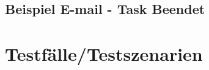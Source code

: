 \documentclass[a4paper,12pt]{article}
\begin{document}
\subsection {Beispiel E-mail - Task Beendet}
\begin{center}
\end{center}
\clearpage

\clearpage
\section{Testfälle/Testszenarien}
\end{document}
